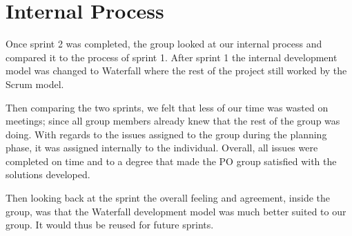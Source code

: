 \section{Internal Process}
Once sprint 2 was completed, the group looked at our internal process and compared it to the process of sprint 1. 
After sprint 1 the internal development model was changed to Waterfall where the rest of the project still worked by the Scrum model.

Then comparing the two sprints, we felt that less of our time was wasted on meetings; since all group members already knew that the rest of the group was doing. 
With regards to the issues assigned to the group during the planning phase, it was assigned internally to the individual. 
Overall, all issues were completed on time and to a degree that made the PO group satisfied with the solutions developed. 

Then looking back at the sprint the overall feeling and agreement, inside the group, was that the Waterfall development model was much better suited to our group. 
It would thus be reused for future sprints.

